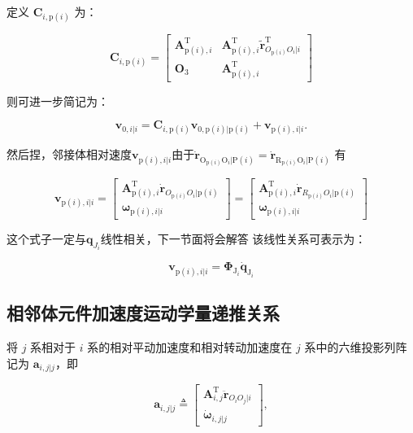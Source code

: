 定义 $\boldsymbol{C}_{i,\mathrm{p}(i)}$ 为：

\[
\boldsymbol{C}_{i,\mathrm{p}(i)}=\begin{bmatrix} \boldsymbol{A}_{\mathrm{p}(i),i}^{\mathrm{T}} & \boldsymbol{A}_{\mathrm{p}(i),i}^{\mathrm{T}} \tilde{\boldsymbol{r}}_{O_{\mathrm{p}(i)} O_i|i}^{\mathrm{T}} \\ \boldsymbol{O}_3 & \boldsymbol{A}_{\mathrm{p}(i),i}^{\mathrm{T}} \end{bmatrix}
\]

则可进一步简记为：

\[
\boldsymbol{v}_{0,i|i} = \boldsymbol{C}_{i,\mathrm{p}(i)} \boldsymbol{v}_{0,\mathrm{p}(i)|\mathrm{p}(i)} + \boldsymbol{v}_{\mathrm{p}(i),i|i}.
\]

然后捏，邻接体相对速度$\boldsymbol{v}_{\mathrm{p}(i),i|i}$由于$\dot{\boldsymbol{r}}_{\mathrm{O}_{\mathrm{p}(i)}\mathrm{O}_{i}|\mathrm{P}(i)} =  \dot{\boldsymbol{r}}_{\mathrm{R}_{\mathrm{p}(i)}\mathrm{O}_{i}|\mathrm{P}(i)}$ 有

\[
\boldsymbol{v}_{\mathrm{p}(i),i|i} = \begin{bmatrix} \boldsymbol{A}_{\mathrm{p}(i),i}^{\mathrm{T}} \dot{\boldsymbol{r}}_{O_{\mathrm{p}(i)} O_i|\mathrm{p}(i)} \\ \boldsymbol{\omega}_{\mathrm{p}(i),i|i} \end{bmatrix} = \begin{bmatrix} \boldsymbol{A}_{\mathrm{p}(i),i}^{\mathrm{T}} \dot{\boldsymbol{r}}_{R_{\mathrm{p}(i)} O_i|\mathrm{p}(i)} \\ \boldsymbol{\omega}_{\mathrm{p}(i),i|i} \end{bmatrix}
\]

这个式子一定与$\boldsymbol{q}_{J_{i}}$线性相关，下一节面将会解答
该线性关系可表示为：

\[
\boldsymbol{v}_{\mathrm{p}(i),i|i} = \boldsymbol{\Phi}_{\mathrm{J}_i} \dot{\boldsymbol{q}}_{\mathrm{J}_i}
\]
\subsection{相邻体元件加速度运动学量递推关系}
将 $j$ 系相对于 $i$ 系的相对平动加速度和相对转动加速度在 $j$ 系中的六维投影列阵记为 $\boldsymbol{a}_{i,j|j}$，即

\[
\boldsymbol{a}_{i,j|j} \triangleq \begin{bmatrix} \boldsymbol{A}_{i,j}^{\mathrm{T}} \ddot{\boldsymbol{r}}_{O_i O_j|i} \\ \dot{\boldsymbol{\omega}}_{i,j|j} \end{bmatrix},
\]

